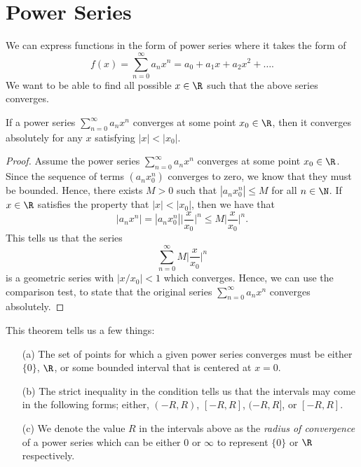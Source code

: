 
\section{Power Series}

We can express functions in the form of power series where it takes the form of 
\[  f(x) = \sum_{ n=0  }^{  \infty  } a_n x^n = a_0 + a_1 x + a_2 x^2 + \dots . \]
We want to be able to find all possible \( x \in \R \) such that the above series converges. 

\begin{tcolorbox}
\begin{thm}
If a power series \( \sum_{ n=0  }^{ \infty  } a_n x^n  \) converges at some point \( x_0 \in \R  \), then it converges absolutely for any \( x  \) satisfying \( | x  |  < | x_0  |  \).
\end{thm}
\end{tcolorbox}

\begin{proof}
Assume the power series \( \sum_{ n=0  }^{ \infty  } a_n x^n  \) converges at some point \( x_0 \in \R  \). Since the sequence of terms \( (a_n x_0^n) \) converges to zero, we know that they must be bounded. Hence, there exists \( M > 0  \) such that \( | a_n x_0^n |  \leq M  \) for all \( n \in \N  \). If \( x \in \R  \) satisfies the property that \( | x  |  < | x_0  |  \), then we have that 
\[  | a_n x^n  |  = | a_n x_0^n  | \Big| \frac{ x  }{  x_0  }  \Big|^n \leq M \Big| \frac{ x  }{  x_0  }  \Big|^n.\] This tells us that the series 
\[  \sum_{ n=0  }^{  \infty   } M \Big| \frac{ x  }{  x_0  }  \Big|^n  \] is a geometric series with \( | x / x_0  |  <  1  \) which converges. Hence, we can use the comparison test, to state that the original series \( \sum_{ n = 0  }^{  \infty  } a_n x^n  \) converges absolutely.
\end{proof}

This theorem tells us a few things:
\begin{enumerate}
    \item[(a)] The set of points for which a given power series converges must be either \( \{ 0  \}  \), \( \R  \), or some bounded interval that is centered at \( x = 0  \). 
    \item[(b)] The strict inequality in the condition tells us that the intervals may come in the following forms; either, \( (-R , R ) \), \( [-R, R ] \), \( (-R, R ] \), or \( [-R , R ] \).
    \item[(c)] We denote the value \( R  \) in the intervals above as the \textit{radius of convergence} of a power series which can be either \( 0  \) or \( \infty  \) to represent \( \{ 0  \}  \) or \( \R   \) respectively.
\end{enumerate} 

